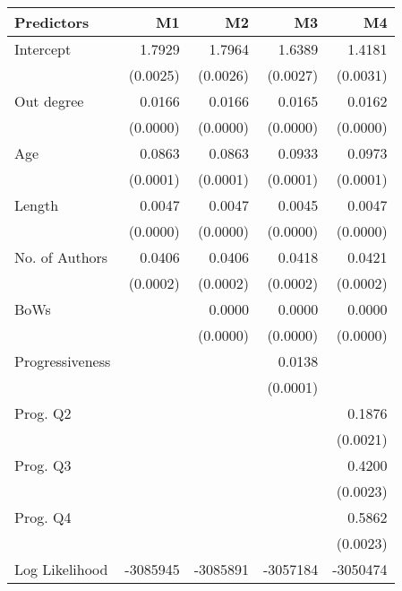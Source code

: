 \begin{tabular}{lrrrr}
\toprule
Predictors & M1 & M2 & M3 & M4 \\
\midrule
Intercept & 1.7929 & 1.7964 & 1.6389 & 1.4181\\
  & (0.0025) & (0.0026) & (0.0027) & (0.0031)\\[4pt]
Out degree & 0.0166 & 0.0166 & 0.0165 & 0.0162\\
  & (0.0000) & (0.0000) & (0.0000) & (0.0000)\\[4pt]
Age & 0.0863 & 0.0863 & 0.0933 & 0.0973\\
  & (0.0001) & (0.0001) & (0.0001) & (0.0001)\\[4pt]
Length & 0.0047 & 0.0047 & 0.0045 & 0.0047\\
  & (0.0000) & (0.0000) & (0.0000) & (0.0000)\\[4pt]
No. of Authors & 0.0406 & 0.0406 & 0.0418 & 0.0421\\
  & (0.0002) & (0.0002) & (0.0002) & (0.0002)\\[4pt]
BoWs &   & 0.0000 & 0.0000 & 0.0000\\
  &   & (0.0000) & (0.0000) & (0.0000)\\[4pt]
Progressiveness &   &   & 0.0138 &  \\
  &   &   & (0.0001) &  \\[4pt]
Prog. Q2 &   &   &   & 0.1876\\
  &   &   &   & (0.0021)\\[4pt]
Prog. Q3 &   &   &   & 0.4200\\
  &   &   &   & (0.0023)\\[4pt]
Prog. Q4 &   &   &   & 0.5862\\
  &   &   &   & (0.0023)\\[4pt]
Log Likelihood & -3085945 & -3085891 & -3057184 & -3050474
\\
\bottomrule
\end{tabular}

